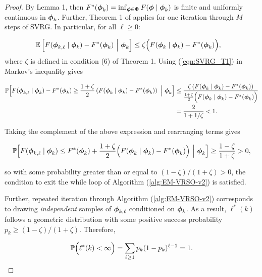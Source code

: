 \begin{proof}

By Lemma 1, then $F^*(\boldsymbol{\phi}_k) = \inf_{\boldsymbol{\phi} \in \boldsymbol{\Phi}} F(\boldsymbol{\phi} \mid \boldsymbol{\phi}_k)$ is finite and uniformly continuous in $\boldsymbol{\phi}_k$. Further, Theorem 1 of \citet{Johnson:2013} applies for one iteration through $M$ steps of SVRG. In particular, for all $\ell \geq 0$:

\begin{align}
    \mathbb{E} & \left[F(\boldsymbol{\phi}_{k,\ell} \mid \boldsymbol{\phi}_{k}) - F^*(\boldsymbol{\phi}_k) ~\Big\vert~ \boldsymbol{\phi}_{k} \right] \leq \zeta \Big(F(\boldsymbol{\phi}_{k} \mid \boldsymbol{\phi}_{k}) - F^*(\boldsymbol{\phi}_k) \Big), \label{eqn:SVRG_T1}
\end{align}
%
where $\zeta$ is defined in condition (6) of Theorem 1. Using (\ref{eqn:SVRG_T1}) in Markov's inequality gives

\begin{align}
    \mathbb{P} \Big[F(\boldsymbol{\phi}_{k,\ell} \mid \boldsymbol{\phi}_{k}) - F^*(\boldsymbol{\phi}_{k}) \geq \frac{1 + \zeta}{2} \left(F(\boldsymbol{\phi}_{k} \mid \boldsymbol{\phi}_{k}) - F^*(\boldsymbol{\phi}_k) \right) ~\Big\vert~ \boldsymbol{\phi}_{k} \Big] &\leq \frac{\zeta \left( F(\boldsymbol{\phi}_{k} \mid \boldsymbol{\phi}_{k}) - F^*(\boldsymbol{\phi}_k) \right)}{\frac{1+\zeta}{2} \Big( F(\boldsymbol{\phi}_{k} \mid \boldsymbol{\phi}_{k}) - F^*(\boldsymbol{\phi}_k) \Big)} \\
    &= \frac{2}{1 + 1/\zeta} < 1.
\end{align}

Taking the complement of the above expression and rearranging terms gives

\begin{equation}
    \mathbb{P} \Big[F(\boldsymbol{\phi}_{k,\ell} \mid \boldsymbol{\phi}_{k}) \leq F^*(\boldsymbol{\phi}_{k}) + \frac{1 + \zeta}{2} \Big(F(\boldsymbol{\phi}_{k} \mid \boldsymbol{\phi}_{k}) - F^*(\boldsymbol{\phi}_{k}) \Big) ~\Big\vert~ \boldsymbol{\phi}_{k} \Big] \geq \frac{1-\zeta}{1 + \zeta} > 0 \label{eqn:markov_ineq},
\end{equation}

so with some probability greater than or equal to $(1-\zeta)/(1+\zeta) > 0$, the condition to exit the while loop of Algorithm (\ref{alg:EM-VRSO-v2}) is satisfied.

Further, repeated iteration through Algorithm (\ref{alg:EM-VRSO-v2}) corresponds to drawing \textit{independent} samples of $\boldsymbol{\phi}_{k,\ell}$ conditioned on $\boldsymbol{\phi}_k$. As a result, $\ell^*(k)$ follows a geometric distribution with some positive success probability $p_k \geq (1-\zeta)/(1+\zeta)$. Therefore, 

\begin{equation}
    \mathbb{P}\Big(\ell^*(k) < \infty \Big) = \sum_{\ell \geq 1} p_k(1-p_k)^{\ell-1} = 1.
\end{equation}
\end{proof}


